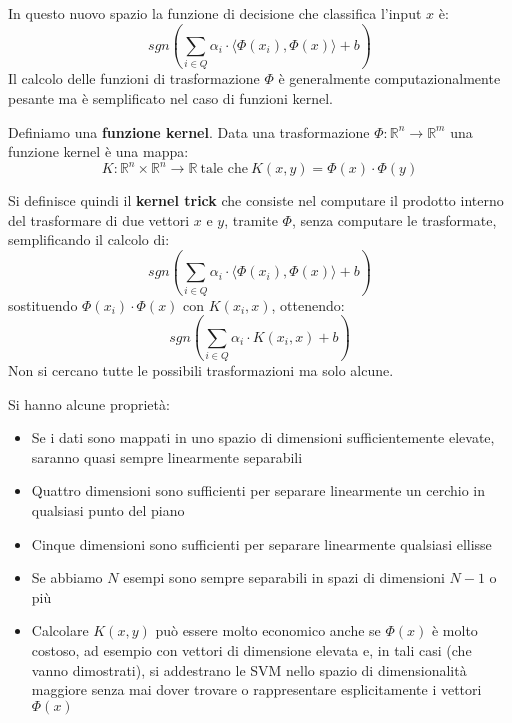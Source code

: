 In questo nuovo spazio la funzione di decisione che classifica l'input $x$ è:
\begin{equation}
    sgn\left(\sum_{i \in Q} \alpha_i \cdot \langle \Phi(x_i), \Phi(x)\rangle + b \right)
\end{equation}
Il calcolo delle funzioni di trasformazione $\Phi$ è generalmente computazionalmente
pesante ma è semplificato nel caso di funzioni kernel.
\begin{definizione}
    Definiamo una \textbf{funzione kernel}. Data una trasformazione
    $\Phi: \mathbb{R}^n \to \mathbb{R}^m$ una funzione kernel è una mappa:
    \begin{equation}
        K: \mathbb{R}^n \times \mathbb{R}^n \to \mathbb{R} \ \text{tale che} \  K(x, y) = \Phi(x) \cdot \Phi(y)
    \end{equation}
\end{definizione}
\begin{definizione}
    Si definisce quindi il \textbf{kernel trick} che consiste nel computare il
    prodotto interno del trasformare di due vettori $x$ e $y$, tramite $\Phi$,
    senza computare le trasformate, semplificando il calcolo di:
    \begin{equation}
        sgn\left(\sum_{i \in Q} \alpha_i \cdot \langle \Phi(x_i), \Phi(x)\rangle + b \right)
    \end{equation}
    sostituendo $\Phi(x_i) \cdot \Phi(x)$ con $K(x_i, x)$, ottenendo:
    \begin{equation}
        sgn\left(\sum_{i \in Q} \alpha_i \cdot K(x_i, x) + b \right)
    \end{equation}
    Non si cercano tutte le possibili trasformazioni ma solo alcune.
\end{definizione}
Si hanno alcune proprietà:
\begin{itemize}
    \item Se i dati sono mappati in uno spazio di dimensioni sufficientemente
          elevate, saranno quasi sempre linearmente separabili
    \item Quattro dimensioni sono sufficienti per separare linearmente un cerchio
          in qualsiasi punto del piano
    \item Cinque dimensioni sono sufficienti per separare linearmente qualsiasi
          ellisse
    \item Se abbiamo $N$ esempi sono sempre separabili in spazi di dimensioni
          $N - 1$ o più
    \item Calcolare $K(x, y)$ può essere molto economico anche se $\Phi(x)$ è
          molto costoso, ad esempio con vettori di dimensione elevata e, in tali casi
          (che vanno dimostrati), si addestrano le SVM nello spazio di dimensionalità
          maggiore senza mai dover trovare o rappresentare esplicitamente i vettori $\Phi(x)$
\end{itemize}
